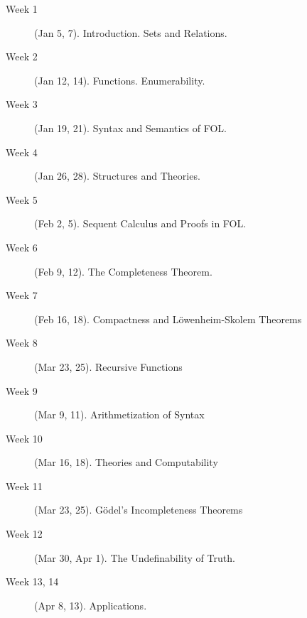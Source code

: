\begin{description}
\item[Week 1] (Jan 5, 7). Introduction. Sets and Relations.

\item[Week 2] (Jan 12, 14). Functions. Enumerability.

\item[Week 3] (Jan 19, 21). Syntax and Semantics of FOL.

\item[Week 4] (Jan 26, 28). Structures and Theories. 

\item[Week 5] (Feb 2, 5). Sequent Calculus and Proofs in FOL.

\item[Week 6] (Feb 9, 12). The Completeness Theorem.

\item[Week 7] (Feb 16, 18). Compactness and L\"owenheim-Skolem Theorems

\item[Week 8] (Mar 23, 25). Recursive Functions 

\item[Week 9] (Mar 9, 11). Arithmetization of Syntax

\item[Week 10] (Mar 16, 18). Theories and Computability

\item[Week 11] (Mar 23, 25). G\"odel's Incompleteness Theorems

\item[Week 12] (Mar 30, Apr 1). The Undefinability of Truth. 

\item[Week 13, 14] (Apr 8, 13). Applications.
\end{description}

